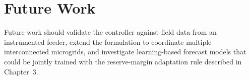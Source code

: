 \section{Future Work}

Future work should validate the controller against field data from an instrumented feeder, extend the formulation to coordinate multiple interconnected microgrids, and investigate learning-based forecast models that could be jointly trained with the reserve-margin adaptation rule described in Chapter~3.

\backmatter

\appendix
